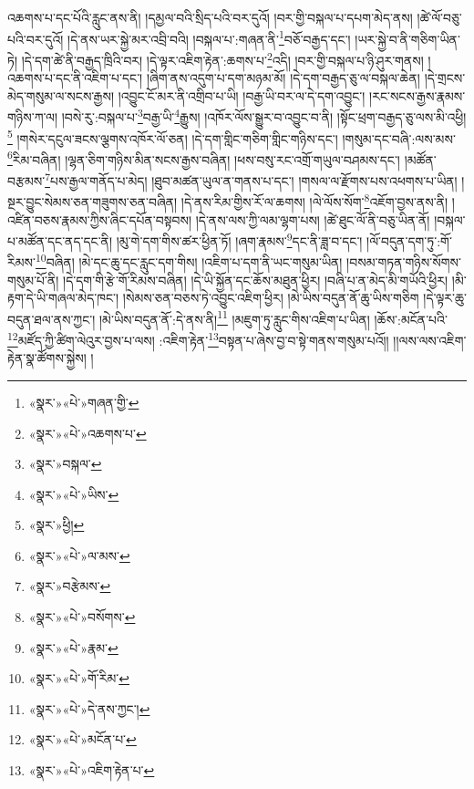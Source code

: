 འཆགས་པ་དང་པོའི་རླུང་ནས་ནི། །དམྱལ་བའི་སྲིད་པའི་བར་དུའོ། །བར་གྱི་བསྐལ་པ་དཔག་མེད་ནས། །ཚེ་ལོ་བཅུ་པའི་བར་དུའོ། །དེ་ནས་ཡར་སྐྱེ་མར་འབྲི་བའི། །བསྐལ་པ་:གཞན་ནི་\footnote{«སྣར་»«པེ་»གཞན་གྱི་}བཅོ་བརྒྱད་དང་། །ཡར་སྐྱེ་བ་ནི་གཅིག་ཡིན་ཏེ། །དེ་དག་ཚེ་ནི་བརྒྱད་ཁྲིའི་བར། །དེ་ལྟར་འཇིག་རྟེན་:ཆགས་པ་\footnote{«སྣར་»«པེ་»འཆགས་པ་}འདི། །བར་གྱི་བསྐལ་པ་ཉི་ཤུར་གནས། །འཆགས་པ་དང་ནི་འཇིག་པ་དང་། །ཞིག་ནས་འདུག་པ་དག་མཉམ་མོ། །དེ་དག་བརྒྱད་ཅུ་ལ་བསྐལ་ཆེན། །དེ་གྲངས་མེད་གསུམ་ལ་སངས་རྒྱས། །འབྱུང་ངོ་མར་ནི་འགྲིབ་པ་ཡི། །བརྒྱ་ཡི་བར་ལ་དེ་དག་འབྱུང་། །རང་སངས་རྒྱས་རྣམས་གཉིས་ཀ་ལ། །བསེ་རུ་:བསྐལ་པ་\footnote{«སྣར་»བསྐལ་}བརྒྱ་ཡི་\footnote{«སྣར་»«པེ་»ཡིས་}རྒྱུས། །འཁོར་ལོས་སྒྱུར་བ་འབྱུང་བ་ནི། །སྟོང་ཕྲག་བརྒྱད་ཅུ་ལས་མི་འཕྱི།\footnote{«སྣར་»ཕྱི།} །གསེར་དངུལ་ཟངས་ལྕགས་འཁོར་ལོ་ཅན། །དེ་དག་གླིང་གཅིག་གླིང་གཉིས་དང་། །གསུམ་དང་བཞི་:ལས་མས་\footnote{«སྣར་»«པེ་»ལ་མས་}རིམ་བཞིན། །ལྷན་ཅིག་གཉིས་མིན་སངས་རྒྱས་བཞིན། །ཕས་བསུ་རང་འགྲོ་གཡུལ་བཤམས་དང་། །མཚོན་བརྩམས་\footnote{«སྣར་»བརྩེམས་}པས་རྒྱལ་གནོད་པ་མེད། །ཐུབ་མཚན་ཡུལ་ན་གནས་པ་དང་། །གསལ་ལ་རྫོགས་པས་འཕགས་པ་ཡིན། །སྔར་བྱུང་སེམས་ཅན་གཟུགས་ཅན་བཞིན། །དེ་ནས་རིམ་གྱིས་རོ་ལ་ཆགས། །ལེ་ལོས་སོག་\footnote{«སྣར་»«པེ་»བསོགས་}འཇོག་བྱས་ནས་ནི། །འཛིན་བཅས་རྣམས་ཀྱིས་ཞིང་དཔོན་བསྟབས། །དེ་ནས་ལས་ཀྱི་ལམ་ལྷག་པས། །ཚེ་ཐུང་ལོ་ནི་བཅུ་ཡིན་ནོ། །བསྐལ་པ་མཚོན་དང་ནད་དང་ནི། །མུ་གེ་དག་གིས་ཚར་ཕྱིན་ཏོ། །ཞག་རྣམས་\footnote{«སྣར་»«པེ་»རྣམ་}དང་ནི་ཟླ་བ་དང་། །ལོ་བདུན་དག་ཏུ་:གོ་རིམས་\footnote{«སྣར་»«པེ་»གོ་རིམ་}བཞིན། །མེ་དང་ཆུ་དང་རླུང་དག་གིས། །འཇིག་པ་དག་ནི་ཡང་གསུམ་ཡིན། །བསམ་གཏན་གཉིས་སོགས་གསུམ་པོ་ནི། །དེ་དག་གི་རྩེ་གོ་རིམས་བཞིན། །དེ་ཡི་སྐྱོན་དང་ཆོས་མཐུན་ཕྱིར། །བཞི་པ་ན་མེད་མི་གཡོའི་ཕྱིར། །མི་རྟག་དེ་ཡི་གཞལ་མེད་ཁང་། །སེམས་ཅན་བཅས་ཏེ་འབྱུང་འཇིག་ཕྱིར། །མེ་ཡིས་བདུན་ནོ་ཆུ་ཡིས་གཅིག །དེ་ལྟར་ཆུ་བདུན་ཐལ་ནས་ཀྱང་། །མེ་ཡིས་བདུན་ནོ་:དེ་ནས་ནི།\footnote{«སྣར་»«པེ་»དེ་ནས་ཀྱང་།} །མཇུག་ཏུ་རླུང་གིས་འཇིག་པ་ཡིན། །ཆོས་:མངོན་པའི་\footnote{«སྣར་»«པེ་»མངོན་པ་}མཛོད་ཀྱི་ཚིག་ལེའུར་བྱས་པ་ལས། :འཇིག་རྟེན་\footnote{«སྣར་»«པེ་»འཇིག་རྟེན་པ་}བསྟན་པ་ཞེས་བྱ་བ་སྟེ་གནས་གསུམ་པའོ།། །།ལས་ལས་འཇིག་རྟེན་སྣ་ཚོགས་སྐྱེས། །
